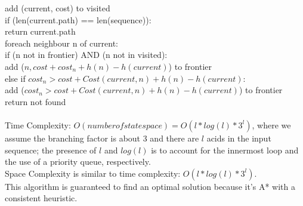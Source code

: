 \documentclass[11pt]{article}
\begin{document}
\begin{onehalfspace}
\begin{itemize}
    \tab\tab add (current, cost) to visited \\
    \tab\tab if (len(current.path) == len(sequence)): \\
    \tab\tab\tab return current.path \\
    \tab\tab foreach neighbour n of current: \\
    \tab\tab\tab if (n not in frontier) AND (n not in visited): \\
    \tab\tab\tab\tab add ($n, cost + cost_n + h(n) - h(current)$) to frontier \\
    \tab\tab\tab else if $cost_n > cost + Cost(current, n) + h(n) - h(current)$: \\
    \tab\tab\tab\tab add ($cost_n > cost + Cost(current, n) + h(n) - h(current)$) to frontier \\
    \tab return not found \\ \\
    Time Complexity: $O(number of state space) = O(l * log(l) * 3^l)$, where we assume the branching factor is about 3 and there are $l$ acids in the input sequence; the presence of $l$ and $log(l)$ is to account for the innermost loop and the use of a priority queue, respectively. \\
    Space Complexity is similar to time complexity: $O(l * log(l) * 3^l)$. \\
    This algorithm is guaranteed to find an optimal solution because it's A* with a consistent heuristic.
    \end{itemize}
\end{onehalfspace}
\end{document}

